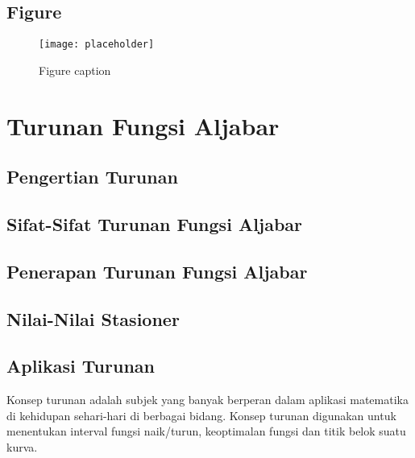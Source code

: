 \documentclass[11pt,fleqn]{book} %
\begin{document}

\section{Figure}

\begin{figure}[h]
\centering\texttt{[image: placeholder]}
\caption{Figure caption}
\end{figure}



\chapter{Turunan Fungsi Aljabar}

\section{Pengertian Turunan}

\section{Sifat-Sifat Turunan Fungsi Aljabar}

\section{Penerapan Turunan Fungsi Aljabar}

\section{Nilai-Nilai Stasioner}

\section{Aplikasi Turunan}
Konsep turunan adalah subjek yang banyak berperan dalam aplikasi matematika di kehidupan sehari-hari di berbagai bidang. Konsep turunan digunakan untuk
menentukan interval fungsi naik/turun, keoptimalan fungsi dan titik belok suatu kurva.
\end{document}
